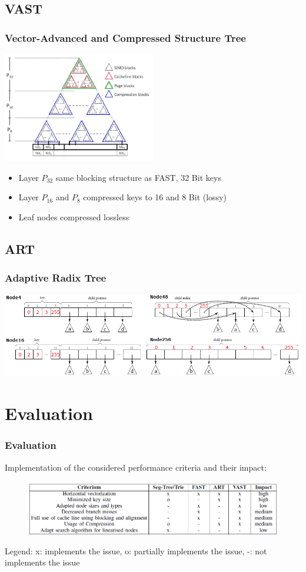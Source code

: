 \documentclass{beamer}
\begin{document}
\subsection{VAST}
\begin{frame}
\frametitle{Vector-Advanced and Compressed Structure Tree}
\begin{center}
	\includegraphics[width=0.5\textwidth]{img/vast2.png}
\end{center}
	\begin{itemize}
	\item Layer $P_{32}$ same blocking structure as FAST, 32 Bit keys
	\item Layer $P_{16}$ and $P_{8}$ compressed keys to 16 and 8 Bit (lossy)
	\item Leaf nodes compressed lossless
\end{itemize}
\end{frame}
\subsection{ART}
\begin{frame}
\frametitle{Adaptive Radix Tree}
\begin{center}
	\includegraphics[width=1.05\textwidth]{img/art2.png}
\end{center}
	
\end{frame}
\section{Evaluation}

\begin{frame}
\frametitle{Evaluation}
Implementation of the considered performance criteria and their impact:
\begin{figure}
	\includegraphics[width=1.05\textwidth]{img/table_eval.png}
\end{figure}
Legend: x: implements the issue, o: partially implements the issue, -: not implements the issue
\end{frame}
\end{document}
